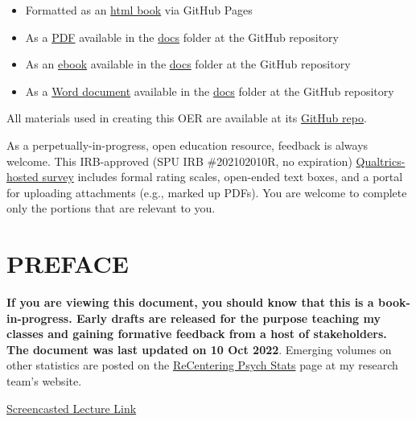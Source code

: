 \documentclass[
  11pt,
]{book}
\providecommand{\tightlist}{%
  \setlength{\itemsep}{0pt}\setlength{\parskip}{0pt}}
\begin{document}
\begin{itemize}
\tightlist
\item
  Formatted as an \href{https://lhbikos.github.io/ReCenterPsychStats/}{html book} via GitHub Pages
\item
  As a \href{https://github.com/lhbikos/ReCenterPsychStats/blob/main/docs/ReCenterPsychStats.pdf}{PDF} available in the \href{https://github.com/lhbikos/ReCenterPsychStats/tree/main/docs}{docs} folder at the GitHub repository
\item
  As an \href{https://github.com/lhbikos/ReCenterPsychStats/blob/main/docs/ReCenterPsychStats.epub}{ebook} available in the \href{https://github.com/lhbikos/ReCenterPsychStats/tree/main/docs}{docs} folder at the GitHub repository
\item
  As a \href{https://github.com/lhbikos/ReCenterPsychStats/blob/main/docs/ReCenterPsychStats.docx}{Word document} available in the \href{https://github.com/lhbikos/ReCenterPsychStats/tree/main/docs}{docs} folder at the GitHub repository
\end{itemize}

All materials used in creating this OER are available at its \href{https://github.com/lhbikos/ReCenterPsychStats}{GitHub repo}.

As a perpetually-in-progress, open education resource, feedback is always welcome. This IRB-approved (SPU IRB \#202102010R, no expiration) \href{https://spupsych.az1.qualtrics.com/jfe/form/SV_0OnBLfut3VIOIS2}{Qualtrics-hosted survey} includes formal rating scales, open-ended text boxes, and a portal for uploading attachments (e.g., marked up PDFs). You are welcome to complete only the portions that are relevant to you.

\hypertarget{preface}{%
\chapter*{PREFACE}\label{preface}}

\textbf{If you are viewing this document, you should know that this is a book-in-progress. Early drafts are released for the purpose teaching my classes and gaining formative feedback from a host of stakeholders. The document was last updated on 10 Oct 2022}. Emerging volumes on other statistics are posted on the \href{https://lhbikos.github.io/BikosRVT/ReCenter.html}{ReCentering Psych Stats} page at my research team's website.

\href{https://spu.hosted.panopto.com/Panopto/Pages/Viewer.aspx?id=c932455e-ef06-444a-bdca-acf7012d759a}{Screencasted Lecture Link}
\end{document}
